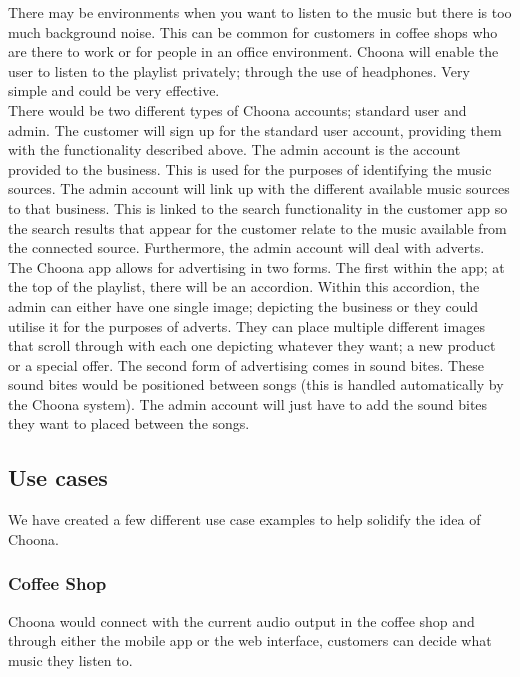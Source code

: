 There may be environments when you want to listen to the music but there is too much background noise.  This can be common for customers in coffee shops who are there to work or for people in an office environment.  Choona will enable the user to listen to the playlist privately; through the use of headphones.  Very simple and could be very effective.  \\

There would be two different types of Choona accounts; standard user and admin.  The customer will sign up for the standard user account, providing them with the functionality described above.  The admin account is the account provided to the business.  This is used for the purposes of identifying the music sources.  The admin account will link up with the different available music sources to that business.  This is linked to the search functionality in the customer app so the search results that appear for the customer relate to the music available from the connected source.  Furthermore, the admin account will deal with adverts.  The Choona app allows for advertising in two forms.  The first within the app; at the top of the playlist, there will be an accordion.  Within this accordion, the admin can either have one single image; depicting the business or they could utilise it for the purposes of adverts.  They can place multiple different images that scroll through with each one depicting whatever they want; a new product or a special offer.  The second form of advertising comes in sound bites.  These sound bites would be positioned between songs (this is handled automatically by the Choona system).  The admin account will just have to add the sound bites they want to placed between the songs.  

\subsection{Use cases}
We have created a few different use case examples to help solidify the idea of Choona.
\subsubsection{Coffee Shop} 
Choona would connect with the current audio output in the coffee shop and through either the mobile app or the web interface, customers can decide what music they listen to.  \\


